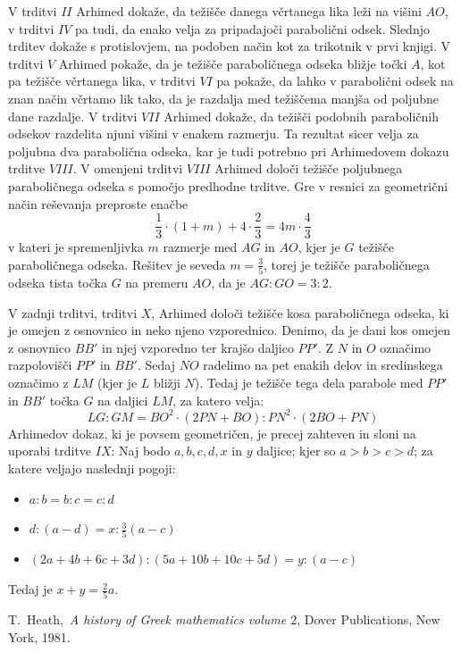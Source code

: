 \documentclass[a4paper, 10pt]{article}
\begin{document}
		V trditvi $II$ Arhimed dokaže, da težišče danega včrtanega lika leži na višini $AO$, v trditvi $IV$ pa tudi, da enako velja za pripadajoči parabolični odsek. Slednjo trditev dokaže s protislovjem, na podoben način kot za trikotnik v prvi knjigi. V trditvi $V$ Arhimed pokaže, da je težišče paraboličnega odseka bližje točki $A$, kot pa težišče včrtanega lika, v trditvi $VI$ pa pokaže, da lahko v parabolični odsek na znan način včrtamo lik tako, da je razdalja med težiščema manjša od poljubne dane razdalje. V trditvi $VII$ Arhimed dokaže, da težišči podobnih paraboličnih odsekov razdelita njuni višini v enakem razmerju. Ta rezultat sicer velja za poljubna dva parabolična odseka, kar je tudi potrebno pri Arhimedovem dokazu trditve $VIII$. V omenjeni trditvi $VIII$ Arhimed določi težišče poljubnega paraboličnega odseka s pomočjo predhodne trditve. Gre v resnici za geometrični način reševanja preproste enačbe $$\frac{1}{3}\cdot(1+m) + 4\cdot\frac{2}{3} = 4m\cdot\frac{4}{3}$$ v kateri je spremenljivka $m$ razmerje med $AG$ in $AO$, kjer je $G$ težišče paraboličnega odseka. Rešitev je seveda $m = \frac{3}{5}$, torej je težišče paraboličnega odseka tista točka $G$ na premeru $AO$, da je $AG:GO = 3:2$.
	
		V zadnji trditvi, trditvi $X$, Arhimed določi težišče kosa paraboličnega odseka, ki je omejen z osnovnico in neko njeno vzporednico. Denimo, da je dani kos omejen z osnovnico $BB'$ in njej vzporedno ter krajšo daljico $PP'$. Z $N$ in $O$ označimo razpolovišči $PP'$ in $BB'$. Sedaj $NO$ radelimo na pet enakih delov in sredinskega označimo z $LM$ (kjer je $L$ bližji $N$). Tedaj je težišče tega dela parabole med $PP'$ in $BB'$ točka $G$ na daljici $LM$, za katero velja:
		$$LG:GM = BO^2\cdot(2PN + BO):PN^2\cdot(2BO + PN)$$
		Arhimedov dokaz, ki je povsem geometričen, je precej zahteven in sloni na uporabi trditve $IX$: Naj bodo $a, b, c, d, x$ in $y$ daljice; kjer so $a>b>c>d$; za katere veljajo naslednji pogoji: \begin{itemize}
		\item $a:b = b:c = c:d$
		\item $d:(a-d) = x: \frac{3}{5}(a-c)$
		\item $(2a+4b+6c+3d) : (5a+10b+10c+5d) = y: (a-c)$
		\end{itemize}
		Tedaj je $x + y = \frac{2}{5}a$.

	\begin{thebibliography}{99}
		
		 T.~Heath,~\emph{A history of Greek mathematics volume $2$}, Dover Publications, New York, 1981.
		
	\end{thebibliography}
\end{document}
